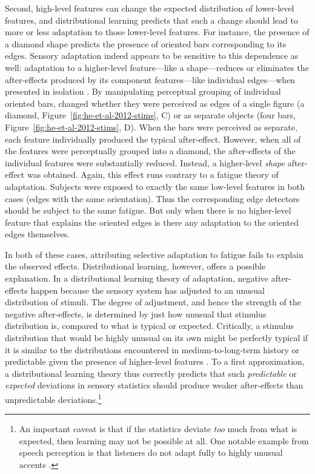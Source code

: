 Second, high-level features can change the expected distribution of lower-level features, and distributional learning predicts that such a change should lead to more or less adaptation to those lower-level features.  For instance, the presence of a diamond shape predicts the presence of oriented bars corresponding to its edges.  Sensory adaptation indeed appears to be sensitive to this dependence as well: adaptation to a higher-level feature---like a shape---reduces or eliminates the after-effects produced by its component features---like individual edges---when presented in isolation \cite{He2012}.
By manipulating perceptual grouping of individual oriented bars, \textcite{He2012} changed whether they were perceived as edges of a single figure (a diamond, Figure~\ref{fig:he-et-al-2012-stims}, C) or as separate objects (four bars, Figure~\ref{fig:he-et-al-2012-stims}, D).  When the bars were perceived as separate, each feature individually produced the typical after-effect.  However, when all of the features were perceptually grouped into a diamond, the after-effects of the individual features were substantially reduced.  Instead, a higher-level \emph{shape} after-effect was obtained.  Again, this effect runs contrary to a fatigue theory of adaptation.  Subjects were exposed to exactly the same low-level features in both cases (edges with the same orientation). Thus the corresponding edge detectors should be subject to the same fatigue.  But only when there is no higher-level feature that explains the oriented edges is there any adaptation to the oriented edges themselves.

In both of these cases, attributing selective adaptation to fatigue fails to explain the observed effects. Distributional learning, however, offers a possible explanation. In a distributional learning theory of adaptation, negative after-effects happen because the sensory system has adjusted to an unusual distribution of stimuli.  The degree of adjustment, and hence the strength of the negative after-effects, is determined by just how unusual that stimulus distribution is, compared to what is typical or expected.  Critically, a stimulus distribution that would be highly unusual on its own might be perfectly typical if it is similar to the distributions encountered in medium-to-long-term history \autocite[e.g., as in ][]{Chopin2012} or predictable given the presence of higher-level features \autocite[e.g., as in ][]{He2012}.  To a first approximation, a distributional learning theory thus correctly predicts that such \emph{predictable} or \emph{expected} deviations in sensory statistics should produce weaker after-effects than unpredictable deviations.\footnote{An important caveat is that if the statistics deviate \emph{too} much from what is expected, then learning may not be possible at all.  One notable example from speech perception is that listeners do not adapt fully to highly unusual accents \protect\autocite[e.g., ][]{Idemaru2011,Sumner2011}.}

